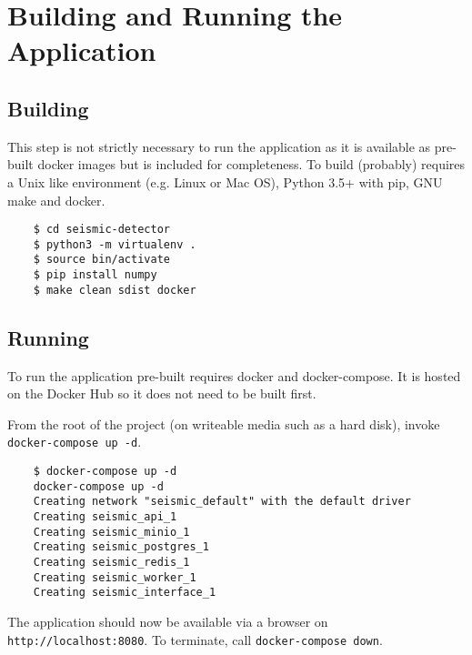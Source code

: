 \documentclass[../report.tex]{subfiles}
\begin{document}
\section{Building and Running the Application}
\subsection{Building}

	This step is not strictly necessary to run the application as it is available as pre-built docker images but is included for completeness.  To build (probably) requires a Unix like environment (e.g. Linux or Mac OS), Python 3.5+ with pip, GNU make and docker.
	
\begin{verbatim}
	$ cd seismic-detector
	$ python3 -m virtualenv .
	$ source bin/activate
	$ pip install numpy
	$ make clean sdist docker
\end{verbatim}

\subsection{Running}

	To run the application pre-built requires docker and docker-compose.  It is hosted on the Docker Hub so it does not need to be built first.
	
	From the root of the project (on writeable media such as a hard disk), invoke \texttt{docker-compose up -d}.
	
\begin{verbatim}
	$ docker-compose up -d
	docker-compose up -d
	Creating network "seismic_default" with the default driver
	Creating seismic_api_1
	Creating seismic_minio_1
	Creating seismic_postgres_1
	Creating seismic_redis_1
	Creating seismic_worker_1
	Creating seismic_interface_1
\end{verbatim}

	The application should now be available via a browser on \texttt{http://localhost:8080}.  To terminate, call \texttt{docker-compose down}.
\end{document}
